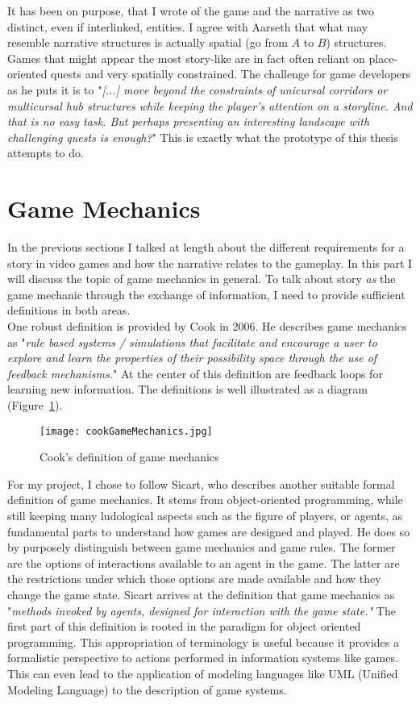 It has been on purpose, that I wrote of the game and the narrative as two distinct, even if interlinked, entities. I agree with Aarseth that what may resemble narrative structures is actually spatial (go from $A$ to $B$) structures. Games that might appear the most story-like are in fact often reliant on place-oriented quests and very spatially constrained. The challenge for game developers as he puts it is to "\textit{[...] move beyond the constraints of unicursal corridors or multicursal hub structures while keeping the player’s attention on a storyline. And that is no easy task. But perhaps presenting an interesting landscape with challenging quests is enough?}" This is exactly what the prototype of this thesis attempts to do.~\cite{Aarseth2005}
\section{Game Mechanics}
In the previous sections I talked at length about the different requirements for a story in video games and how the narrative relates to the gameplay. In this part I will discuss the topic of game mechanics in general. To talk about story \textit{as} the game mechanic through the exchange of information, I need to provide sufficient definitions in both areas.\\
One robust definition is provided by Cook in 2006. He describes game mechanics as "\textit{rule based systems / simulations that facilitate and encourage a user to explore and learn the properties of their possibility space through the use of feedback mechanisms.}" At the center of this definition are feedback loops for learning new information. The definitions is well illustrated as a diagram (Figure~\ref{fig:cookGameMechanics}).~\cite{Cook2006}
\begin{figure}
	\centering
	\texttt{[image: cookGameMechanics.jpg]}
	\caption{Cook's definition of game mechanics~\cite{Cook2006}}
	\label{fig:cookGameMechanics}
\end{figure}
For my project, I chose to follow Sicart, who describes another suitable formal definition of game mechanics. It stems from object-oriented programming, while still keeping many ludological aspects such as the figure of players, or agents, as fundamental parts to understand how games are designed and played. He does so by purposely distinguish between game mechanics and game rules. The former are the options of interactions available to an agent in the game. The latter are the restrictions under which those options are made available and how they change the game state. Sicart arrives at the definition that game mechanics as "\textit{methods invoked by agents, designed for interaction with the game state."} The first part of this definition is rooted in the paradigm for object oriented programming. This appropriation of terminology is useful because it provides a formalistic perspective to actions performed in information systems like games. This can even lead to the application of modeling languages like UML (Unified Modeling Language) to the description of game systems.~\cite{Sicart2008}\\
